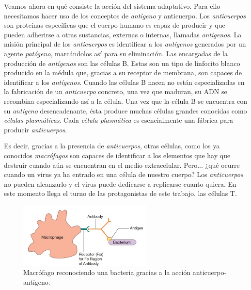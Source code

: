 Veamos ahora en qué consiste la acción del sistema adaptativo. Para ello necesitamos hacer uso de los conceptos de \textit{antígeno} y anticuerpo. Los \textit{anticuerpos} son proteínas específicas que el cuerpo humano es capaz de producir y que pueden adherirse a otras sustancias, externas o internas, llamadas \textit{antígenos}. La misión principal de los \textit{anticuerpos} es identificar a los \textit{antígenos} generados por un agente \textit{patógeno}, marcándolos así para su eliminación. Las encargadas de la producción de \textit{antígenos} son las células B. Estas son un tipo de linfocito blanco producido en la médula que, gracias a su receptor de membrana, son capaces de identificar a los \textit{antígenos}. Cuando las células B nacen no están especializadas en la fabricación de un \textit{anticuerpo} concreto, una vez que maduran, su ADN se recombina especializando así a la célula. Una vez que la célula B se encuentra con su \textit{antígeno} desencadenante, ésta produce muchas células grandes conocidas como \textit{células plasmáticas}. Cada \textit{célula plasmática} es esencialmente una fábrica para producir \textit{anticuerpos}. %

Es decir, gracias a la presencia de \textit{anticuerpos}, otras células, como los ya conocidos \textit{macrófagos} son capaces de identificar a los elementos que hay que destruir cuando aún se encuentran en el medio extracelular. Pero... ¿qué ocurre cuando un virus ya ha entrado en una célula de nuestro cuerpo? Los \textit{anticuerpos} no pueden alcanzarlo y el virus puede dedicarse a replicarse cuanto quiera. En este momento llega el turno de las protagonistas de este trabajo, las células T. 




\begin{figure}[t]
	\centering
	\includegraphics[width=0.6\textwidth]{2_macrofago_anticuerpo}
	\caption{Macrófago reconociendo una bacteria gracias a la acción anticuerpo-antígeno.}
	\label{fig:macrofago_anticuerpo}
\end{figure}


